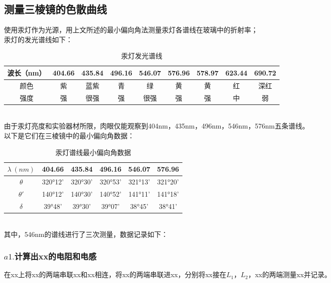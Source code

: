 \documentclass[UTF8]{ctexart}
\begin{document}
\subsection{测量三棱镜的色散曲线}
使用汞灯作为光源，用上文所述的最小偏向角法测量汞灯各谱线在玻璃中的折射率；\\
汞灯的发光谱线如下：\\
\begin{table}[h]
    \begin{center}
        \begin{tabular}{|c|c|c|c|c|c|c|c|c|}  
            \hline    
            波长（nm）& 404.66 & 435.84 & 496.16 & 546.07 & 576.96 & 578.97 & 623.44 & 690.72 \\
            \hline
            颜色 & 紫 & 蓝紫  & 青 & 绿 & 黄 & 黄 & 红 & 深红 \\
            \hline
            强度 &强 &很强 & 强 &很强 & 强 & 强 & 中 & 弱 \\
            \hline
        \end{tabular}
        \caption{汞灯发光谱线}
    \end{center}
\end{table}
\\
由于汞灯亮度和实验器材所限，肉眼仅能观察到404nm，435nm，496nm，546nm，576nm五条谱线。
\\
以下是它们在三棱镜中的最小偏向角数据：\\
\begin{table}[h]
    \begin{center}
        \begin{tabular}{|c|c|c|c|c|c|}
        \hline
        \(\lambda \ (nm)\)&404.66 & 435.84 & 496.16 & 546.07 & 576.96 \\
        \hline
        \(\theta\)&320°12'&320°30'&320°53'&321°13'&321°20'\\
        \hline
        \(\theta'\)&140°12'&140°30'&140°52'&141°11'&141°18'\\
        \hline
        \(\delta\)&39°48'&39°30'&39°07'&38°45'&38°41'\\
        \hline
        \end{tabular}
        \caption{汞灯谱线最小偏向角数据}
    \end{center}
\end{table}\\
其中，546nm的谱线进行了三次测量，数据记录如下：\\

\subsubsection{$a1. $计算出xx的电阻和电感}
在xx上将xx的两端串联xx和xx相连，将xx的两端串联进xx，分别将xx接在$L_1$，$L_2$，xx的两端测量xx并记录。
\end{document}
